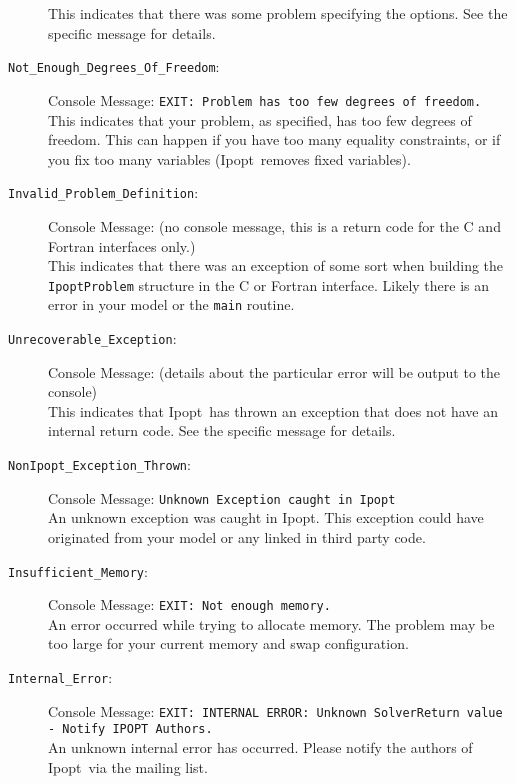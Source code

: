 \documentclass[10pt]{article}
\newcommand{\Ipopt}{{\sc Ipopt}}
\begin{document}
\begin{description}
  This indicates that there was some problem specifying the options.
  See the specific message for details.
\item[{\tt Not\_Enough\_Degrees\_Of\_Freedom}:]  $\;$ \\
  Console Message: {\tt EXIT: Problem has too few degrees of freedom.} \\
  This indicates that your problem, as specified, has too few degrees
  of freedom. This can happen if you have too many equality
  constraints, or if you fix too many variables (\Ipopt\ removes fixed
  variables).
\item[{\tt Invalid\_Problem\_Definition}:]  $\;$ \\
  Console Message: (no console message, this is a return code for the
  C and Fortran interfaces only.) \\
  This indicates that there was an exception of some sort when
  building the {\tt IpoptProblem} structure in the C or Fortran
  interface. Likely there is an error in your model or the {\tt main}
  routine.
\item[{\tt Unrecoverable\_Exception}:]  $\;$ \\
  Console Message: (details about the particular error
  will be output to the console) \\
  This indicates that \Ipopt\ has thrown an exception that does not
  have an internal return code. See the specific message for details.
\item[{\tt NonIpopt\_Exception\_Thrown}:]  $\;$ \\
  Console Message: {\tt Unknown Exception caught in Ipopt} \\
  An unknown exception was caught in \Ipopt. This exception could have
  originated from your model or any linked in third party code.
\item[{\tt Insufficient\_Memory}:]  $\;$ \\
  Console Message: {\tt EXIT: Not enough memory.} \\
  An error occurred while trying to allocate memory. The problem may
  be too large for your current memory and swap configuration.
\item[{\tt Internal\_Error}:]  $\;$ \\
  Console Message: {\tt EXIT: INTERNAL ERROR: Unknown SolverReturn
    value - Notify IPOPT Authors.} \\
  An unknown internal error has occurred. Please notify the authors of
  \Ipopt\ via the mailing list.

\end{description}
\end{document}
